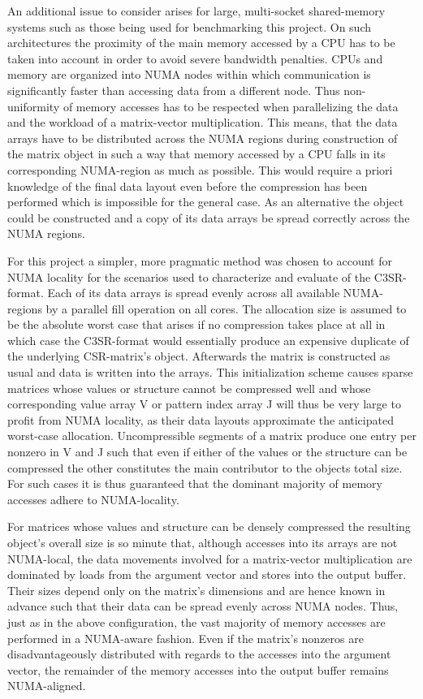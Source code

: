     An additional issue to consider arises for large, multi-socket shared-memory systems such as those being used for
    benchmarking this project. On such architectures the proximity of the main memory accessed by a CPU has to be taken
    into account in order to avoid severe bandwidth penalties. CPUs and memory are organized into NUMA nodes within
    which communication is significantly faster than accessing data from a different node. Thus non-uniformity of memory
    accesses has to be respected when parallelizing the data and the workload of a matrix-vector multiplication. This
    means, that the data arrays have to be distributed across the NUMA regions during construction of the matrix object
    in such a way that memory accessed by a CPU falls in its corresponding NUMA-region as much as possible. This
    would require a priori knowledge of the final data layout even before the compression has been performed which is
    impossible for the general case. As an alternative the object could be constructed and a copy of its data arrays be
    spread correctly across the NUMA regions.

    For this project a simpler, more pragmatic method was chosen to account for NUMA locality for the scenarios used to
    characterize and evaluate of the C3SR-format. Each of its data arrays is spread evenly across all available
    NUMA-regions by a parallel fill operation on all cores. The allocation size is assumed to be the absolute worst case
    that arises if no compression takes place at all in which case the C3SR-format would essentially produce an
    expensive duplicate of the underlying CSR-matrix's object.  Afterwards the matrix is constructed as usual and data
    is written into the arrays. This initialization scheme causes sparse matrices whose values or structure cannot be
    compressed well and whose corresponding value array V or pattern index array J will thus be very large to profit
    from NUMA locality, as their data layouts approximate the anticipated worst-case allocation. Uncompressible segments
    of a matrix produce one entry per nonzero in V and J such that even if either of the values or the structure can be
    compressed the other constitutes the main contributor to the objects total size. For such cases it is thus
    guaranteed that the dominant majority of memory accesses adhere to NUMA-locality.

    For matrices whose values and structure can be densely compressed the resulting object's overall size is so minute
    that, although accesses into its arrays are not NUMA-local, the data movements involved for a matrix-vector
    multiplication are dominated by loads from the argument vector and stores into the output buffer. Their sizes depend
    only on the matrix's dimensions and are hence known in advance such that their data can be spread evenly across NUMA
    nodes. Thus, just as in the above configuration, the vast majority of memory accesses are performed in a NUMA-aware
    fashion. Even if the matrix's nonzeros are disadvantageously distributed with regards to the accesses into the
    argument vector, the remainder of the memory accesses into the output buffer remains NUMA-aligned.

